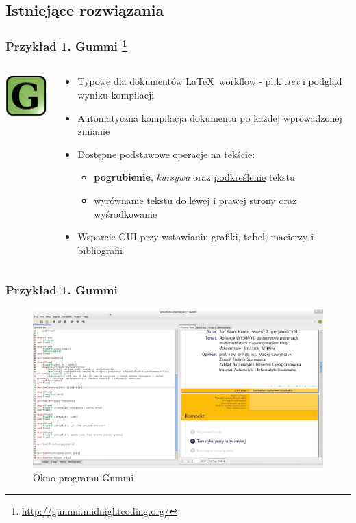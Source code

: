 \documentclass[t]{beamer}
\begin{document}
\subsection{Istniejące rozwiązania}

\begin{frame}[T]
	\frametitle{Przykład 1. Gummi \footnote{\url{http://gummi.midnightcoding.org/}}}
		\begin{columns}[T]
			\begin{column}{.15\textwidth}
				\includegraphics[width=2cm]{gummi_logo.png}
			\end{column}
			\begin{column}{.85\textwidth}
				\begin{itemize}
					\item Typowe dla dokumentów \LaTeX\ workflow - plik \emph{.tex} i podgląd wyniku kompilacji
					\item Automatyczna kompilacja dokumentu po każdej wprowadzonej zmianie
					\item Dostępne  podstawowe operacje na tekście:
					\begin{itemize}
						\item \textbf{pogrubienie}, \emph{kursywa} oraz \underline{podkreślenie} tekstu
						\item wyrównanie tekstu do lewej i prawej strony oraz wyśrodkowanie
					\end{itemize}
					\item Wsparcie GUI przy wstawianiu grafiki, tabel, macierzy i bibliografii
				\end{itemize}
			\end{column}		
		\end{columns}
\end{frame}

\begin{frame}[T]
	\frametitle{Przykład 1. Gummi}
	\begin{figure}[p]
   	    \centering
		\includegraphics[width=.95\textwidth]{gummi_prtscn.png}
   	    \caption{Okno programu Gummi}
	\end{figure}
\end{frame}
\end{document}
